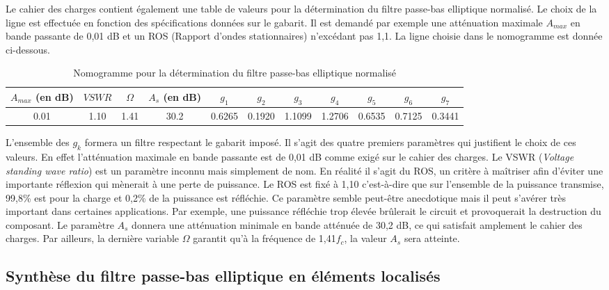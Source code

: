\documentclass[french]{article}
\begin{document}
Le cahier des charges contient également une table de valeurs pour la détermination du filtre passe-bas elliptique normalisé. Le choix de la ligne est effectuée en fonction des spécifications données sur le gabarit. Il est demandé par exemple une atténuation maximale $A_{max}$ en bande passante de 0,01 dB et un ROS (Rapport d'ondes stationnaires) n'excédant pas 1,1. La ligne choisie dans le nomogramme est donnée ci-dessous.

\begin{table}[H]
	\centering
	\begin{tabular}{|c|c|c|c|c|c|c|c|c|c|c|}
		\hline
		$A_{max}$ (en dB) & $VSWR$ & $\Omega$ & $A_s$ (en dB) & $g_1$ & $g_2$ & $g_3$ & $g_4$ & $g_5$ & $g_6$ & $g_7$\\
		\hline
		0.01 & 1.10 & 1.41 & 30.2 & 0.6265 & 0.1920 & 1.1099 & 1.2706 & 0.6535 & 0.7125 & 0.3441\\
		\hline
	\end{tabular}
	\caption{Nomogramme pour la détermination du filtre passe-bas elliptique normalisé}
	\label{tab:nomogramme_elliptique}
\end{table}

L'ensemble des $g_k$ formera un filtre respectant le gabarit imposé. Il s'agit des quatre premiers paramètres qui justifient le choix de ces valeurs. En effet l'atténuation maximale en bande passante est de 0,01 dB comme exigé sur le cahier des charges. Le VSWR (\textit{Voltage standing wave ratio}) est un paramètre inconnu mais simplement de nom. En réalité il s'agit du ROS, un critère à maîtriser afin d'éviter une importante réflexion qui mènerait à une perte de puissance. Le ROS est fixé à 1,10 c'est-à-dire que sur l'ensemble de la puissance transmise, 99,8\% est pour la charge et 0,2\% de la puissance est réfléchie. Ce paramètre semble peut-être anecdotique mais il peut s'avérer très important dans certaines applications. Par exemple, une puissance réfléchie trop élevée brûlerait le circuit et provoquerait la destruction du composant. Le paramètre $A_s$ donnera une atténuation minimale en bande atténuée de 30,2 dB, ce qui satisfait amplement le cahier des charges. Par ailleurs, la dernière variable $\Omega$ garantit qu'à la fréquence de 1,41$f_c$, la valeur $A_s$ sera atteinte.

\newpage

\subsection{Synthèse du filtre passe-bas elliptique en éléments localisés}
\end{document}
